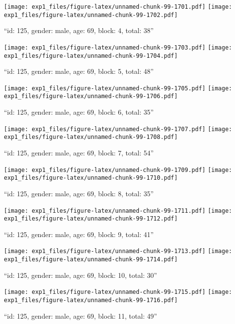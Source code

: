 \documentclass[,]{article}
\begin{document}
\texttt{[image: exp1\_files/figure-latex/unnamed-chunk-99-1701.pdf]}
\texttt{[image: exp1\_files/figure-latex/unnamed-chunk-99-1702.pdf]}

\newpage
[1] 

``id: 125, gender: male, age: 69, block: 4, total: 38''

\texttt{[image: exp1\_files/figure-latex/unnamed-chunk-99-1703.pdf]}
\texttt{[image: exp1\_files/figure-latex/unnamed-chunk-99-1704.pdf]}

\newpage
[1] 

``id: 125, gender: male, age: 69, block: 5, total: 48''

\texttt{[image: exp1\_files/figure-latex/unnamed-chunk-99-1705.pdf]}
\texttt{[image: exp1\_files/figure-latex/unnamed-chunk-99-1706.pdf]}

\newpage
[1] 

``id: 125, gender: male, age: 69, block: 6, total: 35''

\texttt{[image: exp1\_files/figure-latex/unnamed-chunk-99-1707.pdf]}
\texttt{[image: exp1\_files/figure-latex/unnamed-chunk-99-1708.pdf]}

\newpage
[1] 

``id: 125, gender: male, age: 69, block: 7, total: 54''

\texttt{[image: exp1\_files/figure-latex/unnamed-chunk-99-1709.pdf]}
\texttt{[image: exp1\_files/figure-latex/unnamed-chunk-99-1710.pdf]}

\newpage
[1] 

``id: 125, gender: male, age: 69, block: 8, total: 35''

\texttt{[image: exp1\_files/figure-latex/unnamed-chunk-99-1711.pdf]}
\texttt{[image: exp1\_files/figure-latex/unnamed-chunk-99-1712.pdf]}

\newpage
[1] 

``id: 125, gender: male, age: 69, block: 9, total: 41''

\texttt{[image: exp1\_files/figure-latex/unnamed-chunk-99-1713.pdf]}
\texttt{[image: exp1\_files/figure-latex/unnamed-chunk-99-1714.pdf]}

\newpage
[1] 

``id: 125, gender: male, age: 69, block: 10, total: 30''

\texttt{[image: exp1\_files/figure-latex/unnamed-chunk-99-1715.pdf]}
\texttt{[image: exp1\_files/figure-latex/unnamed-chunk-99-1716.pdf]}

\newpage
[1] 

``id: 125, gender: male, age: 69, block: 11, total: 49''
\end{document}
